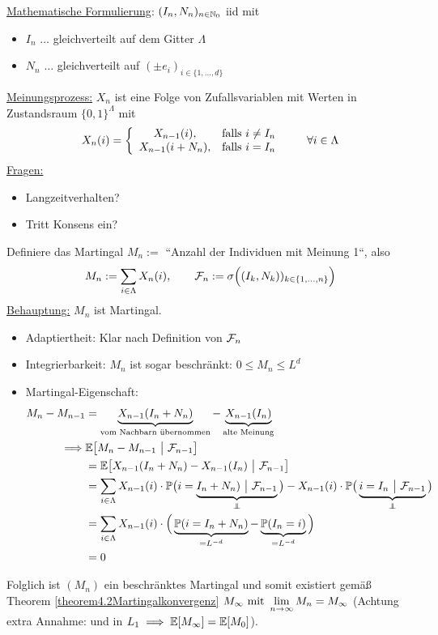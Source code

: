 \begin{beisp}[Wählermodell]
\ul{Mathematische Formulierung}: $(I_n,N_n)_{n\in\mathbb{N}_0}$ iid mit 
\begin{itemize}
\item $I_n$ $\ldots$ gleichverteilt auf dem Gitter $\Lambda$
\item $N_n$ $\ldots$ gleichverteilt auf $(\pm e_i)_{i\in\lbrace1,\ldots,d\rbrace}$
\end{itemize}
\ul{Meinungsprozess:} $X_n$ ist eine Folge von Zufallsvariablen mit Werten in Zustandsraum $\lbrace0,1\rbrace^\Lambda$ mit
\begin{align*}
X_n(i)=\left\lbrace\begin{array}{cl}
X_{n-1}(i), &\text{falls } i\neq I_n\\
X_{n-1}(i+N_n),&\text{falls } i=I_n
\end{array}\right.\qquad\forall i\in\Lambda
\end{align*}
\ul{Fragen:}
\begin{itemize}
	\item Langzeitverhalten?
	\item Tritt Konsens ein?
\end{itemize}
Definiere das Martingal $M_n:=$ ``Anzahl der Individuen mit Meinung 1``, also
\begin{align*}
M_n:=\sum\limits_{i\in\Lambda} X_n(i),\qquad \mathcal{F}_n:=\sigma\Big((I_k,N_k))_{k\in\lbrace1,\ldots,n\rbrace}\Big)
\end{align*}
\ul{Behauptung:} $M_n$ ist Martingal.
\begin{itemize}
\item Adaptiertheit: Klar nach Definition von $\mathcal{F}_n$
\item Integrierbarkeit: $M_n$ ist sogar beschränkt: $0\leq M_n\leq L^d$
\item Martingal-Eigenschaft:
\begin{align*}
M_n-M_{n-1}
&=\underbrace{X_{n-1}(I_n+N_n)}_{\text{vom Nachbarn übernommen}}-\underbrace{X_{n-1}(I_n)}_{\text{alte Meinung}}\\
\implies&\E\big[M_n-M_{n-1}~\big|~\F_{n-1}\big]\\
&=\E\big[X_{n-1}(I_n+N_n)-X_{n-1}(I_n)~\big|~\F_{n-1}\big]\\
&=\sum\limits_{i\in\Lambda} X_{n-1}(i)\cdot\P\big(i=\underbrace{I_n+N_n)~\big|~\F_{n-1}}_{\unab}\big)-X_{n-1}(i)\cdot\P\big(\underbrace{i=I_n~\big|~\F_{n-1}}_{\unab}\big)\\
&=\sum\limits_{i\in\Lambda} X_{n-1}(i)\cdot\Big(\underbrace{\P(i=I_n+N_n)}_{=L^{-d}}-\underbrace{\P(I_n=i)}_{=L^{-d}}\Big)\\
&=0
\end{align*}
\end{itemize}
Folglich ist $(M_n)$ ein beschränktes Martingal und somit existiert gemäß Theorem \ref{theorem4.2Martingalkonvergenz} $M_\infty\text{ mit }\lim\limits_{n\to\infty} M_n=M_\infty$ (Achtung extra Annahme: und in $L_1\implies\mathbb{E}[M_\infty]=\mathbb{E}[M_0]$).\\


\end{beisp}
